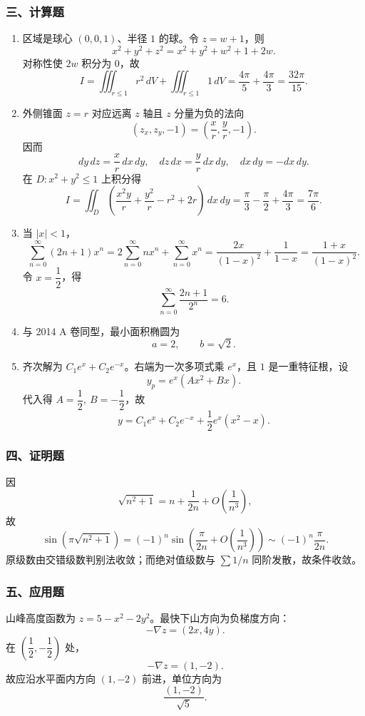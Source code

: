 \subsubsection*{三、计算题}
\begin{enumerate}
  \item 区域是球心 $(0,0,1)$、半径 $1$ 的球。令 $z=w+1$，则
  \[
  x^2+y^2+z^2=x^2+y^2+w^2+1+2w.
  \]
  对称性使 $2w$ 积分为 $0$，故
  \[
  I=\iiint_{r\le1}r^2\,dV+\iiint_{r\le1}1\,dV
  =\frac{4\pi}{5}+\frac{4\pi}{3}=\frac{32\pi}{15}.
  \]
  \item 外侧锥面 $z=r$ 对应远离 $z$ 轴且 $z$ 分量为负的法向
  \[
  (z_x,z_y,-1)=\left(\frac{x}{r},\frac{y}{r},-1\right).
  \]
  因而
  \[
  dy\,dz=\frac{x}{r}\,dx\,dy,\quad dz\,dx=\frac{y}{r}\,dx\,dy,\quad dx\,dy=-dx\,dy.
  \]
  在 $D:x^2+y^2\le1$ 上积分得
  \[
  I=\iint_D\left(\frac{x^2y}{r}+\frac{y^2}{r}-r^2+2r\right)\,dx\,dy
  =\frac{\pi}{3}-\frac{\pi}{2}+\frac{4\pi}{3}
  =\frac{7\pi}{6}.
  \]
  \item 当 $|x|<1$，
  \[
  \sum_{n=0}^{\infty}(2n+1)x^n
  =2\sum_{n=0}^{\infty}nx^n+\sum_{n=0}^{\infty}x^n
  =\frac{2x}{(1-x)^2}+\frac1{1-x}
  =\frac{1+x}{(1-x)^2}.
  \]
  令 $x=\dfrac12$，得
  \[
  \sum_{n=0}^{\infty}\frac{2n+1}{2^n}=6.
  \]
  \item 与 2014 A 卷同型，最小面积椭圆为
  \[
  a=2,\qquad b=\sqrt2.
  \]
  \item 齐次解为 $C_1e^x+C_2e^{-x}$。右端为一次多项式乘 $e^x$，且 $1$ 是一重特征根，设
  \[
  y_p=e^x(Ax^2+Bx).
  \]
  代入得 $A=\dfrac12,\ B=-\dfrac12$，故
  \[
  y=C_1e^x+C_2e^{-x}+\frac12e^x(x^2-x).
  \]
\end{enumerate}

\subsubsection*{四、证明题}
因
\[
\sqrt{n^2+1}=n+\frac1{2n}+O\!\left(\frac1{n^3}\right),
\]
故
\[
\sin(\pi\sqrt{n^2+1})
=(-1)^n\sin\left(\frac{\pi}{2n}+O\!\left(\frac1{n^3}\right)\right)
\sim (-1)^n\frac{\pi}{2n}.
\]
原级数由交错级数判别法收敛；而绝对值级数与 $\sum 1/n$ 同阶发散，故条件收敛。

\subsubsection*{五、应用题}
山峰高度函数为 $z=5-x^2-2y^2$。最快下山方向为负梯度方向：
\[
-\nabla z=(2x,4y).
\]
在 $\left(\dfrac12,-\dfrac12\right)$ 处，
\[
-\nabla z=(1,-2).
\]
故应沿水平面内方向 $(1,-2)$ 前进，单位方向为
\[
\frac{(1,-2)}{\sqrt5}.
\]
